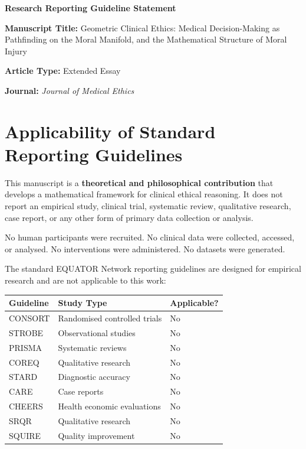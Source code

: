 \documentclass[12pt]{article}
\begin{document}
\begin{center}
{\LARGE\bfseries Research Reporting Guideline Statement}
\end{center}

\bigskip

\noindent\textbf{Manuscript Title:} Geometric Clinical Ethics: Medical Decision-Making as Pathfinding on the Moral Manifold, and the Mathematical Structure of Moral Injury

\noindent\textbf{Article Type:} Extended Essay

\noindent\textbf{Journal:} \emph{Journal of Medical Ethics}

\bigskip

\section*{Applicability of Standard Reporting Guidelines}

This manuscript is a \textbf{theoretical and philosophical contribution} that develops a mathematical framework for clinical ethical reasoning.  It does not report an empirical study, clinical trial, systematic review, qualitative research, case report, or any other form of primary data collection or analysis.

No human participants were recruited.  No clinical data were collected, accessed, or analysed.  No interventions were administered.  No datasets were generated.

The standard EQUATOR Network reporting guidelines are designed for empirical research and are not applicable to this work:

\bigskip

\begin{center}
\begin{tabular}{lll}
\toprule
\textbf{Guideline} & \textbf{Study Type} & \textbf{Applicable?} \\
\midrule
CONSORT & Randomised controlled trials & No \\
STROBE & Observational studies & No \\
PRISMA & Systematic reviews & No \\
COREQ & Qualitative research & No \\
STARD & Diagnostic accuracy & No \\
CARE & Case reports & No \\
CHEERS & Health economic evaluations & No \\
SRQR & Qualitative research & No \\
SQUIRE & Quality improvement & No \\
\bottomrule
\end{tabular}
\end{center}
\end{document}
